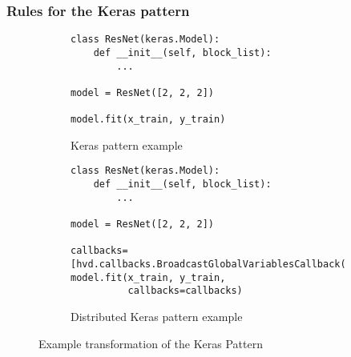 % 
% 
% 
   


\subsubsection{Rules for the Keras pattern}

\begin{figure}[ht!]\centering
  \begin{subfigure}[t]{0.8\textwidth}
  \begin{lstlisting}[style=mpython]
class ResNet(keras.Model):
    def __init__(self, block_list):
        ...

model = ResNet([2, 2, 2])

model.fit(x_train, y_train)\end{lstlisting}
  \caption{Keras pattern example}
    \label{fig:trans:keras:a}
  \end{subfigure}
  \hspace{3mm}
  \begin{subfigure}[t]{0.8\textwidth}
  \begin{lstlisting}[style=mpython]
class ResNet(keras.Model):
    def __init__(self, block_list):
        ...

model = ResNet([2, 2, 2])

callbacks=[hvd.callbacks.BroadcastGlobalVariablesCallback(0)]
model.fit(x_train, y_train,
          callbacks=callbacks)\end{lstlisting}
    \caption{Distributed Keras pattern example}
    \label{fig:trans:keras:b}
  \end{subfigure}
  \caption{Example transformation of the Keras Pattern}
  \label{fig:trans:keras}
\end{figure}

